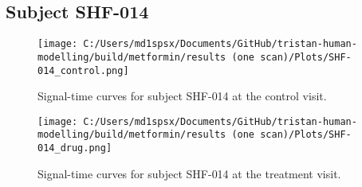 \documentclass{epflreport}%
\begin{document}
\subsection{Subject SHF{-}014}%
\label{subsec:SubjectSHF{-}014}%

%


\begin{figure}[h!]%
\centering%
\texttt{[image: C:/Users/md1spsx/Documents/GitHub/tristan-human-modelling/build/metformin/results (one scan)/Plots/SHF-014\_control.png]}%
\caption{Signal{-}time curves for subject SHF{-}014 at the control visit.}%
\end{figure}

%


\begin{figure}[h!]%
\centering%
\texttt{[image: C:/Users/md1spsx/Documents/GitHub/tristan-human-modelling/build/metformin/results (one scan)/Plots/SHF-014\_drug.png]}%
\caption{Signal{-}time curves for subject SHF{-}014 at the treatment visit.}%
\end{figure}
\end{document}
